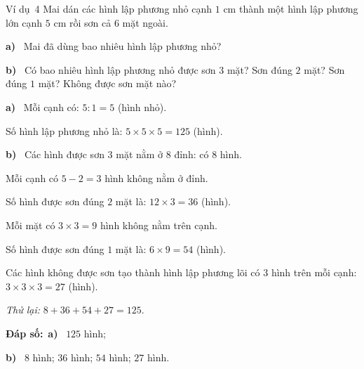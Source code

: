 \documentclass[11pt]{article}
\providecommand{\AnsWord}{Đáp số}
\newcommand{\dapso}[1]{\par\textbf{\AnsWord:}\ #1}
\newcommand{\guide}{\par\vspace{4pt}{\bfseries\color{tmBlue}\GuideWord}\par\vspace{3pt}\nopagebreak}
\newcommand{\pa}[1]{\textbf{#1)}\ }
\newcommand{\gap}{\vspace{0.3cm}}
\def\GuideWord{Hướng dẫn giải.}
\def\AnsWord{Đáp số}
\def\ExWord{Ví dụ}
\begin{document}
\begin{exbox}{\ExWord\ 4}
Mai dán các hình lập phương nhỏ cạnh $1$ cm thành một hình lập phương lớn cạnh $5$ cm rồi sơn cả $6$ mặt ngoài.\par
\pa{a} Mai đã dùng bao nhiêu hình lập phương nhỏ?\par
\pa{b} Có bao nhiêu hình lập phương nhỏ được sơn $3$ mặt? Sơn đúng $2$ mặt? Sơn đúng $1$ mặt? Không được sơn mặt nào?
\guide
\pa{a} Mỗi cạnh có: $5:1=5$ (hình nhỏ).\par Số hình lập phương nhỏ là: $5\times5\times5=125$ (hình).\par
\pa{b} Các hình được sơn $3$ mặt nằm ở $8$ đỉnh: có $8$ hình.\par
Mỗi cạnh có $5-2=3$ hình không nằm ở đỉnh.\par
Số hình được sơn đúng $2$ mặt là: $12\times3=36$ (hình).\par
Mỗi mặt có $3\times3=9$ hình không nằm trên cạnh.\par
Số hình được sơn đúng $1$ mặt là: $6\times9=54$ (hình).\par
Các hình không được sơn tạo thành hình lập phương lõi có $3$ hình trên mỗi cạnh: $3\times3\times3=27$ (hình).\par
\emph{Thử lại:} $8+36+54+27=125$.
\dapso{\pa{a} $125$ hình;\par \pa{b} $8$ hình; $36$ hình; $54$ hình; $27$ hình.}
\end{exbox}
\gap
\end{document}
